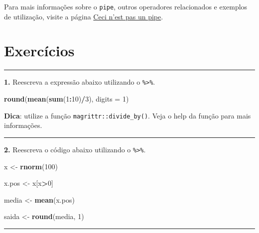 \documentclass[]{book}
\newenvironment{Shaded}{\begin{snugshade}}{\end{snugshade}}
\newcommand{\DataTypeTok}[1]{\textcolor[rgb]{0.13,0.29,0.53}{#1}}
\newcommand{\DecValTok}[1]{\textcolor[rgb]{0.00,0.00,0.81}{#1}}
\newcommand{\KeywordTok}[1]{\textcolor[rgb]{0.13,0.29,0.53}{\textbf{#1}}}
\newcommand{\NormalTok}[1]{#1}
\newcommand{\OperatorTok}[1]{\textcolor[rgb]{0.81,0.36,0.00}{\textbf{#1}}}
\newcommand{\StringTok}[1]{\textcolor[rgb]{0.31,0.60,0.02}{#1}}
\begin{document}
Para mais informações sobre o \texttt{pipe}, outros operadores relacionados e exemplos de utilização, visite a página \href{http://cran.r-project.org/web/packages/magrittr/vignettes/magrittr.html}{Ceci n'est pas un pipe}.

\hypertarget{exercuxedcios-1}{%
\section{Exercícios}\label{exercuxedcios-1}}

\begin{center}\rule{0.5\linewidth}{0.5pt}\end{center}

\textbf{1.} Reescreva a expressão abaixo utilizando o \texttt{\%\textgreater{}\%}.

\begin{Shaded}
\begin{Highlighting}[]
\KeywordTok{round}\NormalTok{(}\KeywordTok{mean}\NormalTok{(}\KeywordTok{sum}\NormalTok{(}\DecValTok{1}\OperatorTok{:}\DecValTok{10}\NormalTok{)}\OperatorTok{/}\DecValTok{3}\NormalTok{), }\DataTypeTok{digits =} \DecValTok{1}\NormalTok{)}
\end{Highlighting}
\end{Shaded}

\textbf{Dica}: utilize a função \texttt{magrittr::divide\_by()}. Veja o help da função para mais informações.

\begin{center}\rule{0.5\linewidth}{0.5pt}\end{center}

\textbf{2.} Reescreva o código abaixo utilizando o \texttt{\%\textgreater{}\%}.

\begin{Shaded}
\begin{Highlighting}[]

\NormalTok{x <-}\StringTok{ }\KeywordTok{rnorm}\NormalTok{(}\DecValTok{100}\NormalTok{)}

\NormalTok{x.pos <-}\StringTok{ }\NormalTok{x[x}\OperatorTok{>}\DecValTok{0}\NormalTok{]}

\NormalTok{media <-}\StringTok{ }\KeywordTok{mean}\NormalTok{(x.pos)}

\NormalTok{saida <-}\StringTok{ }\KeywordTok{round}\NormalTok{(media, }\DecValTok{1}\NormalTok{)}
\end{Highlighting}
\end{Shaded}

\begin{center}\rule{0.5\linewidth}{0.5pt}\end{center}
\end{document}
